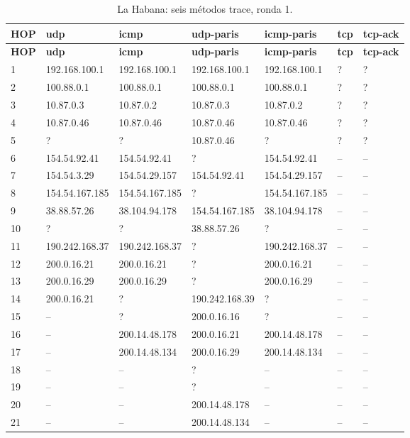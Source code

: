 \endgroup
\begingroup
\fontsize{8}{10}\selectfont
\begin{longtable}{p{0.8cm}p{2.25cm}p{2.25cm}p{2.25cm}p{2.25cm}p{2.25cm}p{2.25cm}}
\caption{La Habana: seis métodos trace, ronda 1.}\label{anexo:trace:200.14.48.134:1} \\
\toprule
\textbf{HOP} & \textbf{udp} & \textbf{icmp} & \textbf{udp-paris} & \textbf{icmp-paris} & \textbf{tcp} & \textbf{tcp-ack} \\ \midrule
\endfirsthead
\toprule
\textbf{HOP} & \textbf{udp} & \textbf{icmp} & \textbf{udp-paris} & \textbf{icmp-paris} & \textbf{tcp} & \textbf{tcp-ack} \\ \midrule
\endhead
1 & 192.168.100.1 & 192.168.100.1 & 192.168.100.1 & 192.168.100.1 & ? & ? \\
2 & 100.88.0.1 & 100.88.0.1 & 100.88.0.1 & 100.88.0.1 & ? & ? \\
3 & 10.87.0.3 & 10.87.0.2 & 10.87.0.3 & 10.87.0.2 & ? & ? \\
4 & 10.87.0.46 & 10.87.0.46 & 10.87.0.46 & 10.87.0.46 & ? & ? \\
5 & ? & ? & 10.87.0.46 & ? & ? & ? \\
6 & 154.54.92.41 & 154.54.92.41 & ? & 154.54.92.41 & -- & -- \\
7 & 154.54.3.29 & 154.54.29.157 & 154.54.92.41 & 154.54.29.157 & -- & -- \\
8 & 154.54.167.185 & 154.54.167.185 & ? & 154.54.167.185 & -- & -- \\
9 & 38.88.57.26 & 38.104.94.178 & 154.54.167.185 & 38.104.94.178 & -- & -- \\
10 & ? & ? & 38.88.57.26 & ? & -- & -- \\
11 & 190.242.168.37 & 190.242.168.37 & ? & 190.242.168.37 & -- & -- \\
12 & 200.0.16.21 & 200.0.16.21 & ? & 200.0.16.21 & -- & -- \\
13 & 200.0.16.29 & 200.0.16.29 & ? & 200.0.16.29 & -- & -- \\
14 & 200.0.16.21 & ? & 190.242.168.39 & ? & -- & -- \\
15 & -- & ? & 200.0.16.16 & ? & -- & -- \\
16 & -- & 200.14.48.178 & 200.0.16.21 & 200.14.48.178 & -- & -- \\
17 & -- & 200.14.48.134 & 200.0.16.29 & 200.14.48.134 & -- & -- \\
18 & -- & -- & ? & -- & -- & -- \\
19 & -- & -- & ? & -- & -- & -- \\
20 & -- & -- & 200.14.48.178 & -- & -- & -- \\
21 & -- & -- & 200.14.48.134 & -- & -- & -- \\
\bottomrule
\end{longtable}
